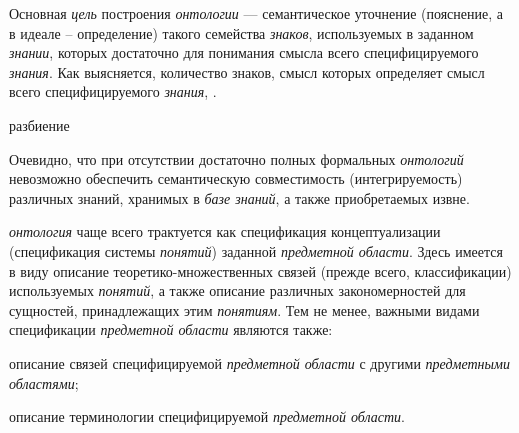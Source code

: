 Основная \textit{цель} построения \textit{онтологии} --- семантическое уточнение (пояснение, а в идеале – определение) такого семейства \textit{знаков}, используемых в заданном \textit{знании}, которых достаточно для понимания смысла всего специфицируемого \textit{знания}. Как выясняется, количество знаков, смысл которых определяет смысл всего специфицируемого \textit{знания}, .

\begin{SCn}
	\begin{scnrelfromset}{разбиение}
		\begin{scnindent}
		\end{scnindent}
	\end{scnrelfromset}
\end{SCn}

Очевидно, что при отсутствии достаточно полных формальных \textit{онтологий} невозможно обеспечить семантическую совместимость (интегрируемость) различных знаний, хранимых в \textit{базе знаний}, а также приобретаемых извне.

\textit{онтология} чаще всего трактуется как спецификация концептуализации (спецификация системы \textit{понятий}) заданной \textit{предметной области}. Здесь имеется в виду описание теоретико-множественных связей (прежде всего, классификации) используемых \textit{понятий}, а также описание различных закономерностей для сущностей, принадлежащих этим \textit{понятиям}. Тем не менее, важными видами спецификации \textit{предметной области} являются также:
\begin{textitemize}
	\item описание связей специфицируемой \textit{предметной области} с другими \textit{предметными областями};
	\item описание терминологии специфицируемой \textit{предметной области}.
\end{textitemize}

\begin{SCn}
\end{SCn}

